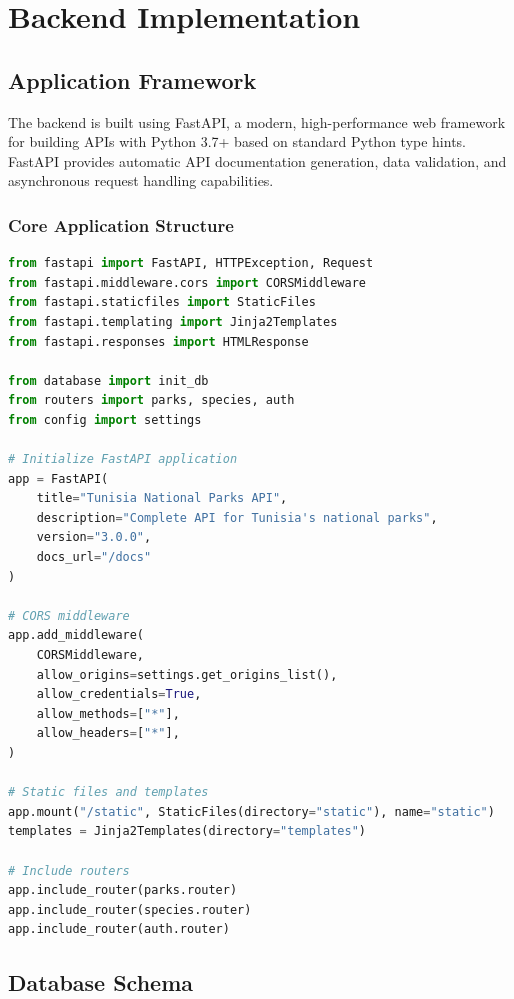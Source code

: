 \documentclass[12pt,a4paper]{report}
\begin{document}
\chapter{Backend Implementation}

\section{Application Framework}

The backend is built using FastAPI, a modern, high-performance web framework for building APIs with Python 3.7+ based on standard Python type hints. FastAPI provides automatic API documentation generation, data validation, and asynchronous request handling capabilities.

\subsection{Core Application Structure}

\begin{lstlisting}[language=Python, caption=Main Application Entry Point]
from fastapi import FastAPI, HTTPException, Request
from fastapi.middleware.cors import CORSMiddleware
from fastapi.staticfiles import StaticFiles
from fastapi.templating import Jinja2Templates
from fastapi.responses import HTMLResponse

from database import init_db
from routers import parks, species, auth
from config import settings

# Initialize FastAPI application
app = FastAPI(
    title="Tunisia National Parks API",
    description="Complete API for Tunisia's national parks",
    version="3.0.0",
    docs_url="/docs"
)

# CORS middleware
app.add_middleware(
    CORSMiddleware,
    allow_origins=settings.get_origins_list(),
    allow_credentials=True,
    allow_methods=["*"],
    allow_headers=["*"],
)

# Static files and templates
app.mount("/static", StaticFiles(directory="static"), name="static")
templates = Jinja2Templates(directory="templates")

# Include routers
app.include_router(parks.router)
app.include_router(species.router)
app.include_router(auth.router)
\end{lstlisting}

\section{Database Schema}
\end{document}
